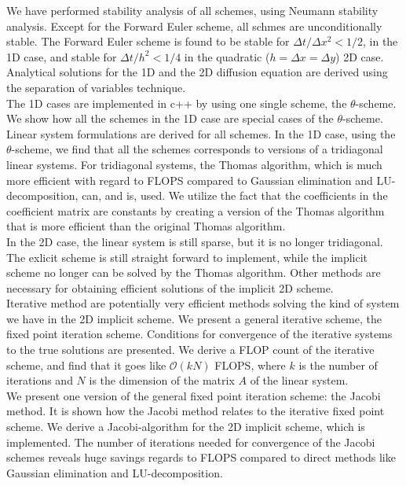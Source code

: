 \documentclass{article}
\begin{document}
We have performed stability analysis of all schemes, using Neumann stability analysis. Except for the Forward Euler scheme, all schmes are unconditionally stable. The Forward Euler scheme is found to be stable for $\Delta t/\Delta x^2 < 1/2$, in the 1D case, and stable for $\Delta t /h^2 < 1/4$ in the quadratic ($h = \Delta x = \Delta y$) 2D case.\\

Analytical solutions for the 1D and the 2D diffusion equation are derived using the separation of variables technique. \\

The 1D cases are implemented in c++ by using one single scheme, the $\theta$-scheme. We show how all the schemes in the 1D case are special cases of the $\theta$-scheme.\\

Linear system formulations are derived for all schemes. In the 1D case, using the $\theta$-scheme, we find that all the schemes corresponds to versions of a tridiagonal linear systems. For tridiagonal systems, the Thomas algorithm, which is much more efficient with regard to FLOPS compared to Gaussian elimination and LU-decomposition, can, and is, used. We utilize the fact that the coefficients in the coefficient matrix are constants by creating a version of the Thomas algorithm that is more efficient than the original Thomas algorithm. \\

In the 2D case, the linear system is still sparse, but it is no longer tridiagonal. The exlicit scheme is still straight forward to implement, while the implicit scheme no longer can be solved by the Thomas algorithm. Other methods are necessary for obtaining efficient solutions of the implicit 2D scheme.\\ 

Iterative method are potentially very efficient methods solving the kind of system we have in the 2D implicit scheme. We present a general iterative scheme, the fixed point iteration scheme. Conditions for convergence of the iterative systems to the true solutions are presented. We derive a FLOP count of the iterative scheme, and find that it goes like $\mathcal{O}(k N)$ FLOPS, where $k$ is the number of iterations and $N$ is the dimension of the matrix $A$ of the linear system. \\

We present one version of the general fixed point iteration scheme: the Jacobi method. It is shown how the Jacobi method relates to the iterative fixed point scheme. We derive a Jacobi-algorithm for the 2D implicit scheme, which is implemented. The number of iterations needed for convergence of the Jacobi schemes reveals huge savings regards to FLOPS compared to direct methods like Gaussian elimination and LU-decomposition.\\
\end{document}

